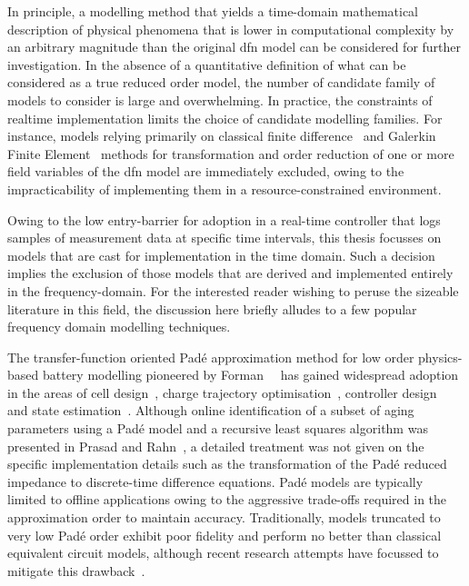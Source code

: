 In principle, a modelling method that yields a time-domain mathematical description of physical phenomena that is lower
in computational complexity by an arbitrary magnitude than the original \gls{dfn} model can be considered for further
investigation. In the absence of a quantitative definition of what can be considered as a true reduced order model, the
number of candidate family of models to consider is large and overwhelming. In practice, the constraints of realtime
implementation limits the choice of candidate modelling families. For instance, models relying primarily on classical
finite difference~\cite{Smith2006} and Galerkin Finite Element~\cite{Dao2012} methods for transformation and order
reduction of one or more field variables of the \gls{dfn} model are immediately excluded, owing to the impracticability
of implementing them in a resource-constrained environment.

Owing to the low entry-barrier for adoption in a real-time controller that logs samples of measurement data at specific
time intervals, this thesis focusses on models that are cast for implementation in the time domain. Such a decision
implies the exclusion of those models that are derived and implemented entirely in the frequency-domain. For the
interested reader wishing to peruse the sizeable literature in this field, the discussion here briefly alludes to a few
popular frequency domain modelling techniques.

The transfer-function oriented Padé approximation method for low order physics-based battery modelling pioneered by
Forman~\etal{}~\cite{Forman2011a} has gained widespread adoption in the areas of cell design~\cite{Marcicki2013}, charge
trajectory optimisation~\cite{Bashash2010}, controller design~\cite{Perez2015} and state
estimation~\cite{Marcicki2013,Moura2012,Bartlett2015}. Although online identification of a subset of aging parameters
using a Padé model and a recursive least squares algorithm was presented in Prasad and Rahn~\cite{Prasad2013}, a
detailed treatment was not given on the specific implementation details such as the transformation of the Padé reduced
impedance to discrete-time difference equations. Padé models are typically limited to offline applications owing to the
aggressive trade-offs required in the approximation order to maintain accuracy. Traditionally, models truncated to very
low Padé order exhibit poor fidelity and perform no better than classical equivalent circuit models, although recent
research attempts have focussed to mitigate this drawback~\cite{Yuan2017a,Yuan2017}.

